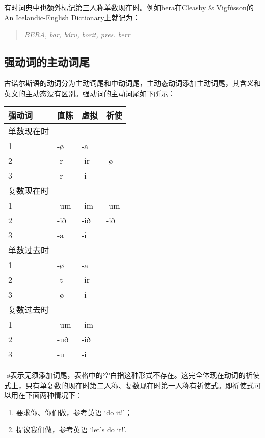 有时词典中也额外标记第三人称单数现在时。例如bera在Cleasby \& Vigfússon的An Icelandic-English Dictionary上就记为：

\begin{quote}
    \textit{BERA, bar, báru, borit, pres. berr}
\end{quote}

\subsection{强动词的主动词尾}\label{强动词的主动词尾}
古诺尔斯语的动词分为主动词尾和中动词尾，主动态动词添加主动词尾，其含义和英文的主动态没有区别。强动词的主动词尾如下所示：
\begin{longtable}{llll}
    \toprule
    强动词     & 直陈 & 虚拟 & 祈使 \\
    \midrule
    \endhead
    \bottomrule
    \endfoot
    单数现在时 &      &      &      \\
    1          & -ø   & -a   &      \\
    2          & -r   & -ir  & -ø   \\
    3          & -r   & -i   &      \\
    复数现在时 &      &      &      \\
    1          & -um  & -im  & -um  \\
    2          & -ið  & -ið  & -ið  \\
    3          & -a   & -i   &      \\
    单数过去时 &      &      &      \\
    1          & -ø   & -a   &      \\
    2          & -t   & -ir  &      \\
    3          & -ø   & -i   &      \\
    复数过去时 &      &      &      \\
    1          & -um  & -im  &      \\
    2          & -uð  & -ið  &      \\
    3          & -u   & -i   &      \\
\end{longtable}

-ø表示无须添加词尾，表格中的空白指这种形式不存在。这完全体现在动词的祈使式上，只有单复数的现在时第二人称、复数现在时第一人称有祈使式。即祈使式可以用在下面两种情况下：

\begin{enumerate}
    \item
          要求你、你们做，参考英语 `do it!'；
    \item
          提议我们做，参考英语 `let's do it!'.
\end{enumerate}


